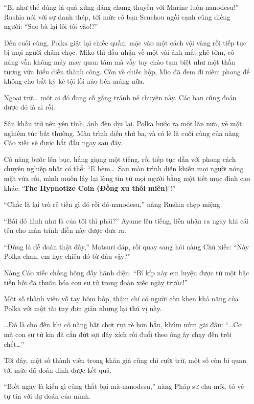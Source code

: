 \documentclass[../main.tex]{subfiles}
\begin{document}
``Bị như thế đúng là quá xứng đáng chung thuyền với Marine luôn-nanodesu!'' Rushia nói với sự đanh thép, tới mức cô bạn Senchou ngồi cạnh cũng điếng người: ``Sao bà lại lôi tôi vào!?''

Đến cuối cùng, Polka giật lại chiếc quần, mặc vào một cách vội vàng rồi tiếp tục bị mọi người châm chọc. Miko thì dẫu nhận về một vài ánh mắt ghê tởm, cô nàng vẫn không mảy may quan tâm mà vẫy tay chào tạm biệt như một thần tượng vừa biểu diễn thành công. Còn vè chiếc hộp, Mio đã đem đi niêm phong để không cho bất kỳ kẻ tội lỗi nào bén mảng nữa.

Ngoại trừ\dots\ một ai đó đang cố gắng tránh né chuyện này. Các bạn cũng đoán được đó là ai rồi.

\ct

Sân khấu trở nên yên tĩnh, ánh đèn dịu lại. Polka bước ra một lần nữa, vẻ mặt nghiêm túc bất thường. Màn trình diễn thứ ba, và có lẽ là cuối cùng của nàng Cáo xiếc sẽ được bắt đầu ngay sau đây.

Cô nàng bước lên bục, hắng giọng một tiếng, rồi tiếp tục dẫn với phong cách chuyên nghiệp nhất có thể: ``E hèm\dots\ Sau màn trình diễn khiến mọi người nóng mặt vừa rồi, mình muốn lấy lại lòng tin từ mọi người bằng một tiết mục đỉnh cao khác: `\textbf{The Hypnotize Coin (Đồng xu thôi miên)}'!''

``Chắc là lại trò rẻ tiền gì đó rồi đó-nanodesu,'' nàng Rushia chẹp miệng.

``Bài đó hình như là của tôi thì phải?'' Ayame lên tiếng, liền nhận ra ngay khi cái tên cho màn trình diễn này được đưa ra.

``Đúng là dễ đoán thật đấy,'' Matsuri đáp, rồi quay sang hỏi nàng Chủ xiếc: ``Này Polka-chan, em học chiêu đó từ đâu vậy?''

Nàng Cáo xiếc chống hông đầy hãnh diện: ``Bí kíp này em luyện được từ một bậc tiền bối đã thuần hóa con sư tử trong đoàn xiếc ngày trước!''

Một số thành viên vỗ tay bôm bốp, thậm chí có người còn khen khả năng của Polka với một tài tuy đơn giản nhưng lại thú vị này.

\dots Đó là cho đến khi cô nàng bất chợt rụt rè hơn hẳn, khúm núm gãi đầu: ``\dots Cơ mà con sư tử kia đã cắn đứt sợi dây xích rồi đuổi theo ông ấy chạy đến trối chết\dots''

Tới đây, một số thành viên trong khán giả cũng chỉ cười trừ, một số còn bi quan tới mức đã đoán định được kết quả.

``Biết ngay là kiểu gì cũng thất bại mà-nanodesu,'' nàng Pháp sư chu môi, tỏ vẻ tự tin với dự đoán của mình.
\end{document}
